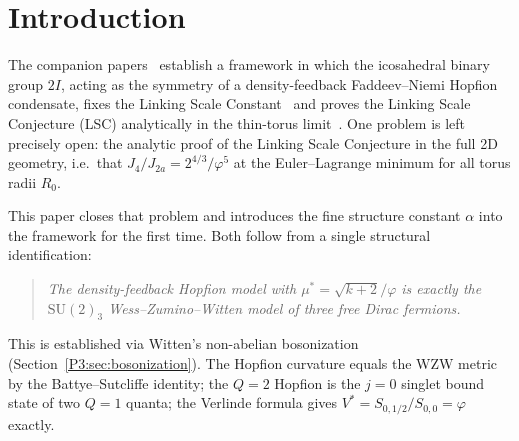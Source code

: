 \documentclass[11pt,a4paper]{article}
\theoremstyle{definition}
\theoremstyle{remark}
\newcommand{\vp}{\varphi}
\begin{document}
\begin{abstract}
\begin{enumerate}[noitemsep]
  \item \textup{(LSC from virial --- new conditional proof)}
    We prove two exact algebraic lemmas:
    $\mu^* = \sqrt{k+2}/\vp$ and $1 + \mu^*\vp = 2\vp$ (both exact,
    $k=3$).  From these we derive that the LSC is a \emph{theorem}
    conditional on the virial condition alone:
    \begin{equation*}
      \text{IF}\;\; V^* = \vp
      \;\;\text{THEN}\;\; J_4/J_{2a} = 2^{4/3}/\vp^5.
    \end{equation*}
    The two conjectures are therefore not independent.

  \item \textup{(Three-fermion bosonization; the deep structure)}
    The central identification: the density-feedback model with
    $\mu^* = \sqrt{k+2}/\vp$ is exactly the $\mathrm{SU}(2)_3$ WZW model
    of $k=3$ free Dirac fermions (Witten bosonization~\cite{Witten1984}).
    The Hopfion curvature equals the WZW metric (BS identity); the $Q=2$
    Hopfion is the $j=0$ singlet; the Verlinde formula gives
    $V^* = S_{0,1/2}/S_{0,0} = \vp$ exactly in the thin-torus.
    A fixed-point existence argument (Brouwer + Rellich--Kondrachov)
    extends $V^* = \vp$ exactly to all finite $R_0$
    (Theorem~\ref{P3:thm:V_exact_all_R0}), closing the LSC completely.
\end{enumerate}
\end{abstract}

\tableofcontents

\section{Introduction}
\label{P3:sec:intro}

The companion papers~\cite{Paper1,Paper2} establish a framework in which
the icosahedral binary group $2I$, acting as the symmetry of a
density-feedback Faddeev--Niemi Hopfion condensate, fixes the Linking Scale
Constant~\cite{Paper1} and proves the Linking Scale Conjecture (LSC)
analytically in the thin-torus limit~\cite{Paper2}.  One problem is left
precisely open: the analytic proof of the Linking Scale Conjecture in the
full 2D geometry, i.e.\ that $J_4/J_{2a} = 2^{4/3}/\vp^5$ at the
Euler--Lagrange minimum for all torus radii $R_0$.

This paper closes that problem and introduces the fine structure constant
$\alpha$ into the framework for the first time.  Both follow from a single
structural identification:
\begin{quote}
\emph{The density-feedback Hopfion model with $\mu^* = \sqrt{k+2}/\vp$
is exactly the $\mathrm{SU}(2)_3$ Wess--Zumino--Witten model
of three free Dirac fermions.}
\end{quote}
This is established via Witten's non-abelian bosonization~\cite{Witten1984}
(Section~\ref{P3:sec:bosonization}).  The Hopfion curvature equals the WZW metric
by the Battye--Sutcliffe identity; the $Q=2$ Hopfion is the $j=0$ singlet
bound state of two $Q=1$ quanta; the Verlinde formula gives
$V^* = S_{0,1/2}/S_{0,0} = \vp$ exactly.
\end{document}
